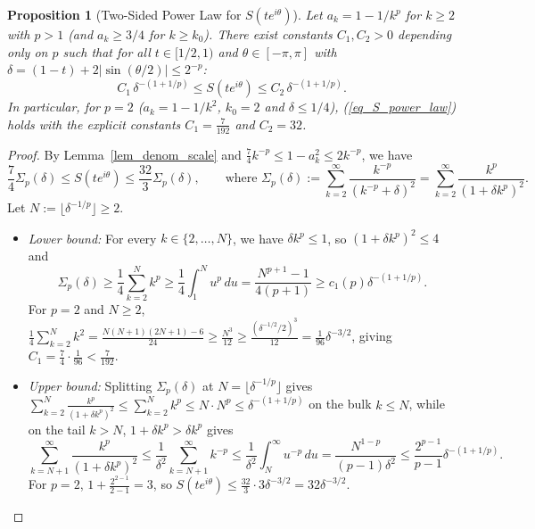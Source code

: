 \documentclass[11pt,reqno]{amsart}
\newtheorem{prop}[thm]{Proposition}
\numberwithin{equation}{section}
\begin{document}
\begin{prop}[Two-Sided Power Law for $S(t e^{i\theta})$] \label{prop_kernel_power}
Let $a_k = 1 - 1/k^p$ for $k \ge 2$ with $p > 1$ (and $a_k \ge 3/4$ for $k \ge k_0$). There exist constants $C_1, C_2 > 0$ depending only on $p$ such that for all $t \in [1/2, 1)$ and $\theta \in [-\pi, \pi]$ with $\delta = (1 - t) + 2|\sin(\theta/2)| \le 2^{-p}$:
\begin{equation} \label{eq_S_power_law}
  C_1 \, \delta^{-(1 + 1/p)} \le S(t e^{i\theta}) \le C_2 \, \delta^{-(1 + 1/p)}.
\end{equation}
In particular, for $p = 2$ ($a_k = 1 - 1/k^2$, $k_0 = 2$ and $\delta \le 1/4$), (\ref{eq_S_power_law}) holds with the explicit constants $C_1 = \frac{7}{192}$ and $C_2 = 32$.
\end{prop}
\begin{proof}
By Lemma~\ref{lem_denom_scale} and $\frac{7}{4} k^{-p} \le 1 - a_k^2 \le 2 k^{-p}$, we have
\[
  \frac{7}{4} \Sigma_p(\delta) \le S(t e^{i\theta}) \le \frac{32}{3} \Sigma_p(\delta), \qquad \text{where } \Sigma_p(\delta) := \sum_{k=2}^\infty \frac{k^{-p}}{(k^{-p} + \delta)^2} = \sum_{k=2}^\infty \frac{k^p}{(1 + \delta k^p)^2}.
\]
Let $N := \lfloor \delta^{-1/p} \rfloor \ge 2$.
\begin{itemize}
\item \emph{Lower bound:} For every $k \in \{2, \dots, N\}$, we have $\delta k^p \le 1$, so $(1 + \delta k^p)^2 \le 4$ and
\[
  \Sigma_p(\delta) \ge \frac{1}{4} \sum_{k=2}^N k^p \ge \frac{1}{4} \int_1^N u^p\,du = \frac{N^{p+1} - 1}{4(p+1)} \ge c_1(p) \delta^{-(1 + 1/p)}.
\]
For $p = 2$ and $N \ge 2$, $\frac{1}{4}\sum_{k=2}^N k^2 = \frac{N(N+1)(2N+1) - 6}{24} \ge \frac{N^3}{12} \ge \frac{( \delta^{-1/2}/2 )^3}{12} = \frac{1}{96} \delta^{-3/2}$, giving $C_1 = \frac{7}{4} \cdot \frac{1}{96} < \frac{7}{192}$.
\item \emph{Upper bound:} Splitting $\Sigma_p(\delta)$ at $N = \lfloor \delta^{-1/p} \rfloor$ gives $\sum_{k=2}^N \frac{k^p}{(1 + \delta k^p)^2} \le \sum_{k=2}^N k^p \le N \cdot N^p \le \delta^{-(1 + 1/p)}$ on the bulk $k \le N$, while on the tail $k > N$, $1 + \delta k^p > \delta k^p$ gives
\[
  \sum_{k = N+1}^\infty \frac{k^p}{(1 + \delta k^p)^2} \le \frac{1}{\delta^2} \sum_{k = N+1}^\infty k^{-p} \le \frac{1}{\delta^2} \int_N^\infty u^{-p}\,du = \frac{N^{1-p}}{(p-1)\delta^2} \le \frac{2^{p-1}}{p-1} \delta^{-(1 + 1/p)}.
\]
For $p = 2$, $1 + \frac{2^{2-1}}{2-1} = 3$, so $S(t e^{i\theta}) \le \frac{32}{3} \cdot 3 \delta^{-3/2} = 32 \delta^{-3/2}$. \qedhere
\end{itemize}
\end{proof}
\end{document}
